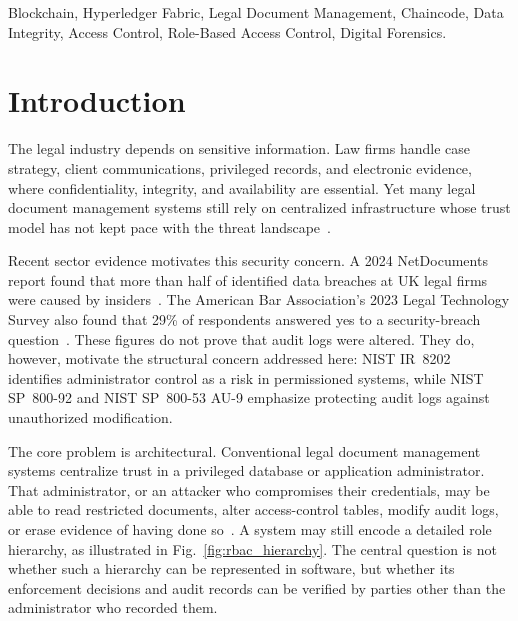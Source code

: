 \documentclass{ieeeaccess}
\begin{document}
\begin{keywords}
Blockchain, Hyperledger Fabric, Legal Document Management, Chaincode, Data Integrity, Access Control, Role-Based Access Control,
Digital Forensics.
\end{keywords}

\titlepgskip=15pt
\maketitle

\section{Introduction}
\label{sec:introduction}

The legal industry depends on sensitive information. Law firms handle case
strategy, client communications, privileged records, and electronic evidence,
where confidentiality, integrity, and availability are essential. Yet many
legal document management systems still rely on centralized infrastructure
whose trust model has not kept pace with the threat landscape~\cite{aba2023,verizon2025}.

Recent sector evidence motivates this security concern. A 2024 NetDocuments
report found that more than half of identified data breaches at UK legal firms
were caused by insiders~\cite{ico2024trends}. The American Bar
Association's 2023 Legal Technology Survey also found that 29\% of respondents
answered yes to a security-breach question~\cite{aba2023}. These figures do
not prove that audit logs were altered. They do, however, motivate the
structural concern addressed here: NIST IR~8202~\cite{nistir8202} identifies
administrator control as a risk in permissioned systems, while NIST SP~800-92
\cite{nist800092} and NIST SP~800-53 AU-9 \cite{nist80053} emphasize protecting
audit logs against unauthorized modification.

The core problem is architectural. Conventional legal document management
systems centralize trust in a privileged database or application
administrator. That administrator, or an attacker who compromises their
credentials, may be able to read restricted documents, alter access-control
tables, modify audit logs, or erase evidence of having done so~\cite{nistir8202}.
A system may still encode a detailed role hierarchy, as illustrated in
Fig.~\ref{fig:rbac_hierarchy}. The central question is not whether such a
hierarchy can be represented in software, but whether its enforcement
decisions and audit records can be verified by parties other than the
administrator who recorded them.
\end{document}
